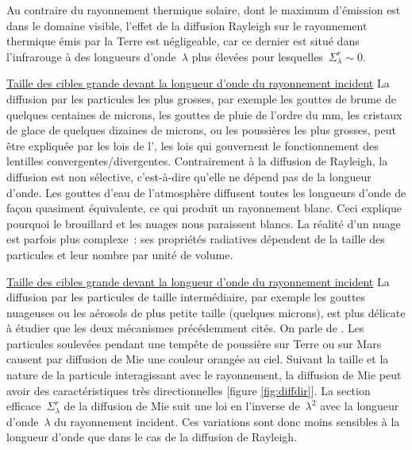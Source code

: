 \begin{finger}
\begin{citemize}
\item Au contraire du rayonnement thermique solaire, dont le maximum d'émission est dans le domaine visible, l'effet de la diffusion Rayleigh sur le rayonnement thermique émis par la Terre est négligeable, car ce dernier est situé dans l'infrarouge à des longueurs d'onde~$\lambda$ plus élevées pour lesquelles~$\Sigma_\lambda^r \sim 0$. 
\end{citemize}



\item \underline{Taille des cibles grande devant la longueur d'onde du rayonnement incident} La diffusion par les particules les plus grosses, par exemple les gouttes de brume de quelques centaines de microns, les gouttes de pluie de l'ordre du mm, les cristaux de glace de quelques dizaines de microns, ou les poussières les plus grosses, peut être expliquée par les lois de l', les lois qui gouvernent le fonctionnement des lentilles convergentes/divergentes. Contrairement à la diffusion de Rayleigh, la diffusion est non sélective, c'est-à-dire qu'elle ne dépend pas de la longueur d'onde. Les gouttes d'eau de l'atmosphère diffusent toutes les longueurs d'onde de façon quasiment équivalente, ce qui produit un rayonnement blanc. Ceci explique pourquoi le brouillard et les nuages nous paraissent blancs. La réalité d'un nuage est parfois plus complexe~: ses propriétés radiatives dépendent de la taille des particules et leur nombre par unité de volume.
\item \underline{Taille des cibles grande devant la longueur d'onde du rayonnement incident} La diffusion par les particules de taille intermédiaire, par exemple les gouttes nuageuses ou les aérosols de plus petite taille (quelques microns), est plus délicate à étudier que les deux mécanismes précédemment cités. On parle de . Les particules soulevées pendant une tempête de poussière sur Terre ou sur Mars causent par diffusion de Mie une couleur orangée au ciel. Suivant la taille et la nature de la particule interagissant avec le rayonnement, la diffusion de Mie peut avoir des caractéristiques très directionnelles [figure \ref{fig:diffdir}]. La section efficace~$\Sigma_\lambda^r$ de la diffusion de Mie suit une loi en l'inverse de~$\lambda^2$ avec la longueur d'onde~$\lambda$ du rayonnement incident. Ces variations sont donc moins sensibles à la longueur d'onde que dans le cas de la diffusion de Rayleigh.
\end{finger}


